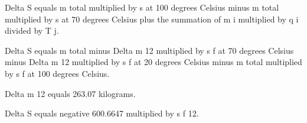 Delta S equals m total multiplied by s at 100 degrees Celsius minus m total multiplied by s at 70 degrees Celsius plus the summation of m i multiplied by q i divided by T j.  

Delta S equals m total minus Delta m 12 multiplied by s f at 70 degrees Celsius minus Delta m 12 multiplied by s f at 20 degrees Celsius minus m total multiplied by s f at 100 degrees Celsius.  

Delta m 12 equals 263.07 kilograms.  

Delta S equals negative 600.6647 multiplied by s f 12.